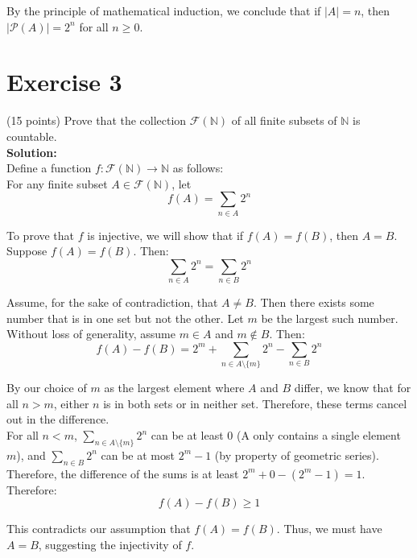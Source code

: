 \documentclass{article}
\begin{document}
By the principle of mathematical induction, we conclude that if $|A| = n$, then $|\mathcal{P}(A)| = 2^n$ for all $n \geq 0$.

\newpage

\section*{Exercise 3}
(15 points) Prove that the collection $\mathcal{F}(\mathbb{N})$ of all finite subsets of $\mathbb{N}$ is countable. \\

\textbf{Solution:} \\

Define a function $f: \mathcal{F}(\mathbb{N}) \rightarrow \mathbb{N}$ as follows: \\

For any finite subset $A \in \mathcal{F}(\mathbb{N})$, let
\[f(A) = \sum_{n \in A} 2^n\]

To prove that $f$ is injective, we will show that if $f(A) = f(B)$, then $A = B$. \\

Suppose $f(A) = f(B)$. Then:
\[\sum_{n \in A} 2^n = \sum_{n \in B} 2^n\]

Assume, for the sake of contradiction, that $A \neq B$. Then there exists some number that is in one set but not the other. Let $m$ be the largest such number. \\

Without loss of generality, assume $m \in A$ and $m \notin B$. Then:
\[f(A) - f(B) = 2^m + \sum_{n \in A \setminus \{m\}} 2^n - \sum_{n \in B} 2^n\]

By our choice of $m$ as the largest element where $A$ and $B$ differ, we know that for all $n > m$, either $n$ is in both sets or in neither set. Therefore, these terms cancel out in the difference. \\

For all $n < m$, $\sum_{n \in A \setminus \{m\}} 2^n$ can be at least $0$ (A only contains a single element $m$), and $\sum_{n \in B} 2^n$ can be at most $2^m - 1$ (by property of geometric series). \\

Therefore, the difference of the sums is at least $2^m + 0 - (2^m - 1) = 1$. \\

Therefore:
\[f(A) - f(B) \geq 1\]

This contradicts our assumption that $f(A) = f(B)$. Thus, we must have $A = B$, suggesting the injectivity of $f$. \\
\end{document}
